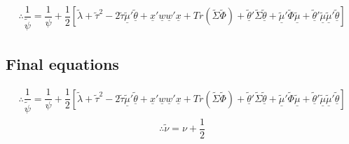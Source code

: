 \documentclass[fleqn]{minimal}
\begin{document}
\begin{align*}
  \therefore
  \dfrac{1}{\tilde{\psi}}
  =
  \dfrac{1}{\psi}
  + \dfrac{1}{2}
  \left[
    \tilde{\lambda} + \tilde{\tau}^2
    - 2\tilde{\tau}\underline{\tilde{\mu}}'\underline{\tilde{\theta}}
    + \underline{x}'\underline{w}\underline{w}'\underline{x}
    + Tr \left( \tilde{\Sigma}\tilde{\Phi}\right)
    + \underline{\tilde{\theta}}'\tilde{\Sigma}\underline{\tilde{\theta}}
    + \underline{\tilde{\mu}}'\tilde{\Phi}\underline{\tilde{\mu}}
    + \underline{\tilde{\theta}}'\underline{\tilde{\mu}}\underline{\tilde{\mu}}'\underline{\tilde{\theta}}
  \right]
\end{align*}

\subsection{Final equations}

\begin{align*}
  \therefore
  \dfrac{1}{\tilde{\psi}}
  =
  \dfrac{1}{\psi}
  + \dfrac{1}{2}
  \left[
    \tilde{\lambda} + \tilde{\tau}^2
    - 2\tilde{\tau}\underline{\tilde{\mu}}'\underline{\tilde{\theta}}
    + \underline{x}'\underline{w}\underline{w}'\underline{x}
    + Tr \left( \tilde{\Sigma}\tilde{\Phi}\right)
    + \underline{\tilde{\theta}}'\tilde{\Sigma}\underline{\tilde{\theta}}
    + \underline{\tilde{\mu}}'\tilde{\Phi}\underline{\tilde{\mu}}
    + \underline{\tilde{\theta}}'\underline{\tilde{\mu}}\underline{\tilde{\mu}}'\underline{\tilde{\theta}}
  \right]
\end{align*}
\begin{align*}
  \therefore
  \tilde{\nu}
  =
  \nu
  +\dfrac{1}{2}
\end{align*}
\end{document}
